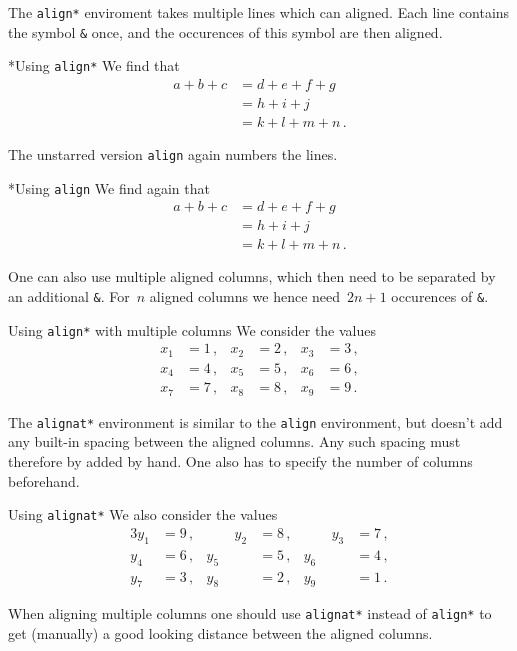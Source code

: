 The \texttt{align*} enviroment takes multiple lines which can aligned.
Each line contains the symbol \texttt{\&} once, and the occurences of this symbol are then aligned.
\begin{showlatex}*{Using \texttt{align*}}
We find that
\begin{align*}
  a + b + c
  &=
  d + e + f + g
  \\
  &=
  h + i + j
  \\
  &=
  k + l + m + n \,.
\end{align*}
\end{showlatex}
The unstarred version \texttt{align} again numbers the lines.
\begin{showlatex}*{Using \texttt{align}}
We find again that
\begin{align}
  a + b + c
  &=
  d + e + f + g
  \\
  &=
  h + i + j
  \\
  &=
  k + l + m + n \,.
\end{align}
\end{showlatex}
One can also use multiple aligned columns, which then need to be separated by an additional \texttt{\&}.
For~$n$ aligned columns we hence need~$2n+1$ occurences of \texttt{\&}.
\begin{showlatex}{Using \texttt{align*} with multiple columns}
We consider the values
\begin{align*}
  x_1 &= 1 \,,  &   x_2 &= 2 \,,  &   x_3 &= 3 \,,  \\
  x_4 &= 4 \,,  &   x_5 &= 5 \,,  &   x_6 &= 6 \,,  \\
  x_7 &= 7 \,,  &   x_8 &= 8 \,,  &   x_9 &= 9 \,.
\end{align*}
\end{showlatex}

The \texttt{alignat*} environment is similar to the \texttt{align} environment, but doesn’t add any built-in spacing between the aligned columns.
Any such spacing must therefore by added by hand.
One also has to specify the number of columns beforehand.
\begin{showlatex}{Using \texttt{alignat*}}
We also consider the values
\begin{alignat*}{3}
  y_1 &= 9 \,,  &\qquad   y_2 &= 8 \,,  &\qquad   y_3 &= 7 \,,  \\
  y_4 &= 6 \,,  &         y_5 &= 5 \,,  &         y_6 &= 4 \,,  \\
  y_7 &= 3 \,,  &         y_8 &= 2 \,,  &         y_9 &= 1 \,.
\end{alignat*}
\end{showlatex}
When aligning multiple columns one should use \texttt{alignat*} instead of \texttt{align*} to get (manually) a good looking distance between the aligned columns.



